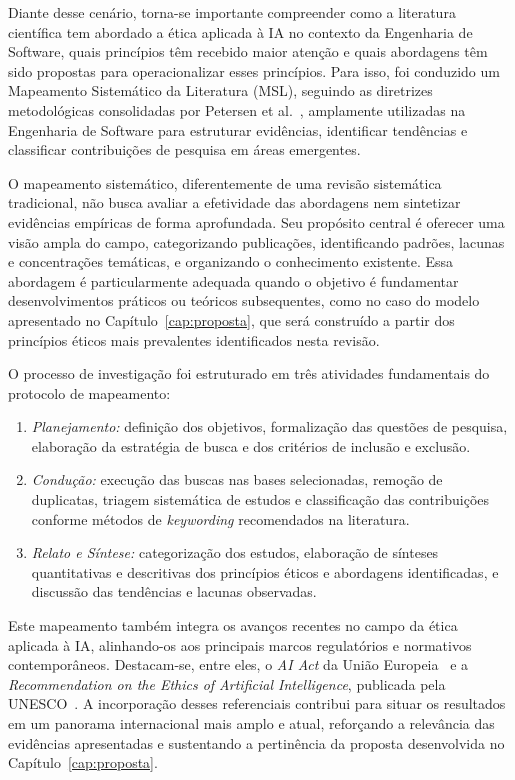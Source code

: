 Diante desse cenário, torna-se importante compreender como a literatura científica tem abordado a ética aplicada à IA no contexto da Engenharia de Software, quais princípios têm recebido maior atenção e quais abordagens têm sido propostas para operacionalizar esses princípios. Para isso, foi conduzido um Mapeamento Sistemático da Literatura (MSL), seguindo as diretrizes metodológicas consolidadas por Petersen et al.~\cite{Petersen2015}, amplamente utilizadas na Engenharia de Software para estruturar evidências, identificar tendências e classificar contribuições de pesquisa em áreas emergentes.

O mapeamento sistemático, diferentemente de uma revisão sistemática tradicional, não busca avaliar a efetividade das abordagens nem sintetizar evidências empíricas de forma aprofundada. Seu propósito central é oferecer uma visão ampla do campo, categorizando publicações, identificando padrões, lacunas e concentrações temáticas, e organizando o conhecimento existente. Essa abordagem é particularmente adequada quando o objetivo é fundamentar desenvolvimentos práticos ou teóricos subsequentes, como no caso do modelo apresentado no Capítulo~\ref{cap:proposta}, que será construído a partir dos princípios éticos mais prevalentes identificados nesta revisão.

O processo de investigação foi estruturado em três atividades fundamentais do protocolo de mapeamento:

\begin{enumerate}
    \item \textit{Planejamento:} definição dos objetivos, formalização das questões de pesquisa, elaboração da estratégia de busca e dos critérios de inclusão e exclusão.

    \item \textit{Condução:} execução das buscas nas bases selecionadas, remoção de duplicatas, triagem sistemática de estudos e classificação das contribuições conforme métodos de \textit{keywording} recomendados na literatura.

    \item \textit{Relato e Síntese:} categorização dos estudos, elaboração de sínteses quantitativas e descritivas dos princípios éticos e abordagens identificadas, e discussão das tendências e lacunas observadas.
\end{enumerate}

Este mapeamento também integra os avanços recentes no campo da ética aplicada à IA, alinhando-os aos principais marcos regulatórios e normativos contemporâneos. Destacam-se, entre eles, o \textit{AI Act} da União Europeia~\cite{EUAIAct2024} e a \textit{Recommendation on the Ethics of Artificial Intelligence}, publicada pela UNESCO~\cite{UNESCO2021}. A incorporação desses referenciais contribui para situar os resultados em um panorama internacional mais amplo e atual, reforçando a relevância das evidências apresentadas e sustentando a pertinência da proposta desenvolvida no Capítulo~\ref{cap:proposta}.

